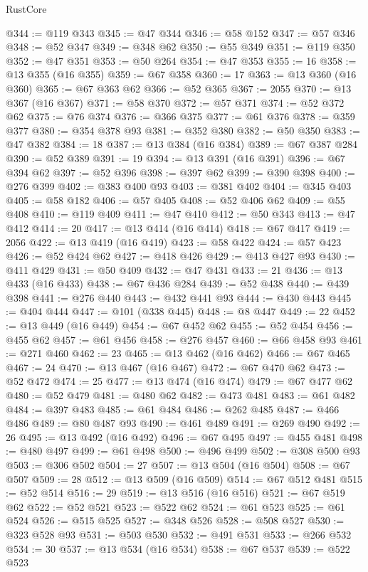 \begin{lexlean}{RustCore}
\begin{coremodule}
@344 := @119 @343
@345 := @47 @344
@346 := @58 @152
@347 := @57 @346
@348 := @52 @347
@349 := @348 @62
@350 := @55 @349
@351 := @119 @350
@352 := @47 @351
@353 := @50 @264
@354 := @47 @353
@355 := 16
@358 := @13 @355 (@16 @355)
@359 := @67 @358
@360 := 17
@363 := @13 @360 (@16 @360)
@365 := @67 @363 @62
@366 := @52 @365
@367 := 2055
@370 := @13 @367 (@16 @367)
@371 := @58 @370
@372 := @57 @371
@374 := @52 @372 @62
@375 := @76 @374
@376 := @366 @375
@377 := @61 @376
@378 := @359 @377
@380 := @354 @378 @93
@381 := @352 @380
@382 := @50 @350
@383 := @47 @382
@384 := 18
@387 := @13 @384 (@16 @384)
@389 := @67 @387 @284
@390 := @52 @389
@391 := 19
@394 := @13 @391 (@16 @391)
@396 := @67 @394 @62
@397 := @52 @396
@398 := @397 @62
@399 := @390 @398
@400 := @276 @399
@402 := @383 @400 @93
@403 := @381 @402
@404 := @345 @403
@405 := @58 @182
@406 := @57 @405
@408 := @52 @406 @62
@409 := @55 @408
@410 := @119 @409
@411 := @47 @410
@412 := @50 @343
@413 := @47 @412
@414 := 20
@417 := @13 @414 (@16 @414)
@418 := @67 @417
@419 := 2056
@422 := @13 @419 (@16 @419)
@423 := @58 @422
@424 := @57 @423
@426 := @52 @424 @62
@427 := @418 @426
@429 := @413 @427 @93
@430 := @411 @429
@431 := @50 @409
@432 := @47 @431
@433 := 21
@436 := @13 @433 (@16 @433)
@438 := @67 @436 @284
@439 := @52 @438
@440 := @439 @398
@441 := @276 @440
@443 := @432 @441 @93
@444 := @430 @443
@445 := @404 @444
@447 := @101 (@338 @445)
@448 := @8 @447
@449 := 22
@452 := @13 @449 (@16 @449)
@454 := @67 @452 @62
@455 := @52 @454
@456 := @455 @62
@457 := @61 @456
@458 := @276 @457
@460 := @66 @458 @93
@461 := @271 @460
@462 := 23
@465 := @13 @462 (@16 @462)
@466 := @67 @465
@467 := 24
@470 := @13 @467 (@16 @467)
@472 := @67 @470 @62
@473 := @52 @472
@474 := 25
@477 := @13 @474 (@16 @474)
@479 := @67 @477 @62
@480 := @52 @479
@481 := @480 @62
@482 := @473 @481
@483 := @61 @482
@484 := @397 @483
@485 := @61 @484
@486 := @262 @485
@487 := @466 @486
@489 := @80 @487 @93
@490 := @461 @489
@491 := @269 @490
@492 := 26
@495 := @13 @492 (@16 @492)
@496 := @67 @495
@497 := @455 @481
@498 := @480 @497
@499 := @61 @498
@500 := @496 @499
@502 := @308 @500 @93
@503 := @306 @502
@504 := 27
@507 := @13 @504 (@16 @504)
@508 := @67 @507
@509 := 28
@512 := @13 @509 (@16 @509)
@514 := @67 @512 @481
@515 := @52 @514
@516 := 29
@519 := @13 @516 (@16 @516)
@521 := @67 @519 @62
@522 := @52 @521
@523 := @522 @62
@524 := @61 @523
@525 := @61 @524
@526 := @515 @525
@527 := @348 @526
@528 := @508 @527
@530 := @323 @528 @93
@531 := @503 @530
@532 := @491 @531
@533 := @266 @532
@534 := 30
@537 := @13 @534 (@16 @534)
@538 := @67 @537
@539 := @522 @523

\end{coremodule}
\end{lexlean}
